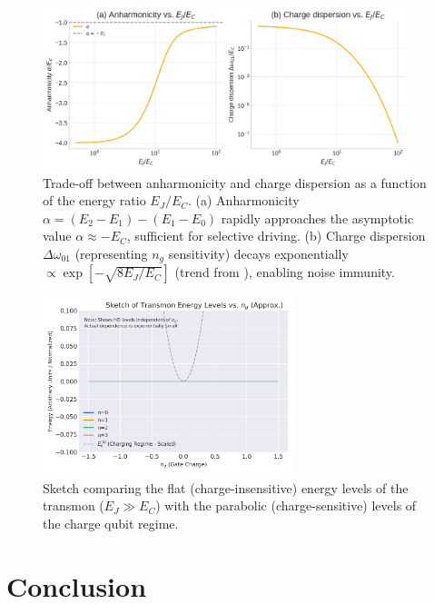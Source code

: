 \documentclass[12pt]{article}
\begin{document}
\begin{figure}[htbp]
    \centering
    \includegraphics[width=0.95\textwidth]{fig_anharm_dispersion.png}
    \caption{Trade-off between anharmonicity and charge dispersion as a function of the energy ratio $E_J/E_C$. 
    (a) Anharmonicity $\alpha = (E_2-E_1)-(E_1-E_0)$ rapidly approaches the asymptotic value $\alpha \approx -E_C$, sufficient for selective driving. 
    (b) Charge dispersion $\Delta\omega_{01}$ (representing $n_g$ sensitivity) decays exponentially $\propto\exp[-\sqrt{8E_J/E_C}]$ (trend from \cite{Koch2007}), enabling noise immunity.}
    \label{fig:anharm_vs_dispersion} 
\end{figure}

\begin{figure}[htbp] 
    \centering
    \includegraphics[width=0.65\textwidth]{fig_transmon_levels.png}
    \caption{Sketch comparing the flat (charge-insensitive) energy levels of the transmon ($E_J \gg E_C$) with the parabolic (charge-sensitive) levels of the charge qubit regime.}
    \label{fig:transmon_levels} 
\end{figure}

\section*{Conclusion}
\end{document}
